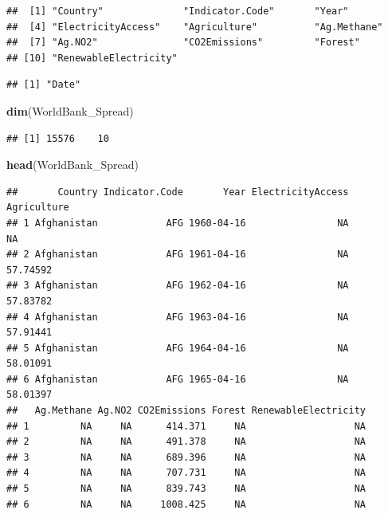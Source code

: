 \documentclass[12pt,]{article}
\newenvironment{Shaded}{\begin{snugshade}}{\end{snugshade}}
\newcommand{\KeywordTok}[1]{\textcolor[rgb]{0.13,0.29,0.53}{\textbf{#1}}}
\newcommand{\OperatorTok}[1]{\textcolor[rgb]{0.81,0.36,0.00}{\textbf{#1}}}
\newcommand{\NormalTok}[1]{#1}
\begin{document}
\begin{verbatim}
##  [1] "Country"              "Indicator.Code"       "Year"                
##  [4] "ElectricityAccess"    "Agriculture"          "Ag.Methane"          
##  [7] "Ag.NO2"               "CO2Emissions"         "Forest"              
## [10] "RenewableElectricity"
\end{verbatim}

\begin{Shaded}
\end{Shaded}

\begin{verbatim}
## [1] "Date"
\end{verbatim}

\begin{Shaded}
\begin{Highlighting}[]
\KeywordTok{dim}\NormalTok{(WorldBank_Spread)}
\end{Highlighting}
\end{Shaded}

\begin{verbatim}
## [1] 15576    10
\end{verbatim}

\begin{Shaded}
\begin{Highlighting}[]
\KeywordTok{head}\NormalTok{(WorldBank_Spread)}
\end{Highlighting}
\end{Shaded}

\begin{verbatim}
##       Country Indicator.Code       Year ElectricityAccess Agriculture
## 1 Afghanistan            AFG 1960-04-16                NA          NA
## 2 Afghanistan            AFG 1961-04-16                NA    57.74592
## 3 Afghanistan            AFG 1962-04-16                NA    57.83782
## 4 Afghanistan            AFG 1963-04-16                NA    57.91441
## 5 Afghanistan            AFG 1964-04-16                NA    58.01091
## 6 Afghanistan            AFG 1965-04-16                NA    58.01397
##   Ag.Methane Ag.NO2 CO2Emissions Forest RenewableElectricity
## 1         NA     NA      414.371     NA                   NA
## 2         NA     NA      491.378     NA                   NA
## 3         NA     NA      689.396     NA                   NA
## 4         NA     NA      707.731     NA                   NA
## 5         NA     NA      839.743     NA                   NA
## 6         NA     NA     1008.425     NA                   NA
\end{verbatim}
\end{document}
